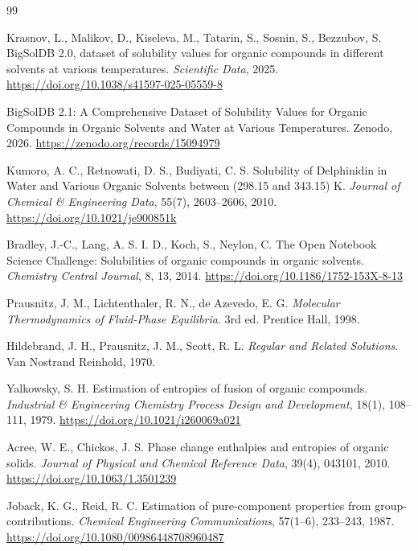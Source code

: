 \documentclass[11pt]{article}
\theoremstyle{definition}
\begin{document}
\begin{thebibliography}{99}

 Krasnov, L., Malikov, D., Kiseleva, M., Tatarin, S., Sosnin, S., Bezzubov, S. BigSolDB 2.0, dataset of solubility values for organic compounds in different solvents at various temperatures. \textit{Scientific Data}, 2025. \url{https://doi.org/10.1038/s41597-025-05559-8}

 BigSolDB 2.1: A Comprehensive Dataset of Solubility Values for Organic Compounds in Organic Solvents and Water at Various Temperatures. Zenodo, 2026. \url{https://zenodo.org/records/15094979}

 Kumoro, A. C., Retnowati, D. S., Budiyati, C. S. Solubility of Delphinidin in Water and Various Organic Solvents between (298.15 and 343.15) K. \textit{Journal of Chemical \& Engineering Data}, 55(7), 2603--2606, 2010. \url{https://doi.org/10.1021/je900851k}

 Bradley, J.-C., Lang, A. S. I. D., Koch, S., Neylon, C. The Open Notebook Science Challenge: Solubilities of organic compounds in organic solvents. \textit{Chemistry Central Journal}, 8, 13, 2014. \url{https://doi.org/10.1186/1752-153X-8-13}

 Prausnitz, J. M., Lichtenthaler, R. N., de Azevedo, E. G. \textit{Molecular Thermodynamics of Fluid-Phase Equilibria}. 3rd ed. Prentice Hall, 1998.

 Hildebrand, J. H., Prausnitz, J. M., Scott, R. L. \textit{Regular and Related Solutions}. Van Nostrand Reinhold, 1970.

 Yalkowsky, S. H. Estimation of entropies of fusion of organic compounds. \textit{Industrial \& Engineering Chemistry Process Design and Development}, 18(1), 108--111, 1979. \url{https://doi.org/10.1021/i260069a021}

 Acree, W. E., Chickos, J. S. Phase change enthalpies and entropies of organic solids. \textit{Journal of Physical and Chemical Reference Data}, 39(4), 043101, 2010. \url{https://doi.org/10.1063/1.3501239}

 Joback, K. G., Reid, R. C. Estimation of pure-component properties from group-contributions. \textit{Chemical Engineering Communications}, 57(1--6), 233--243, 1987. \url{https://doi.org/10.1080/00986448708960487}


\end{thebibliography}
\end{document}
